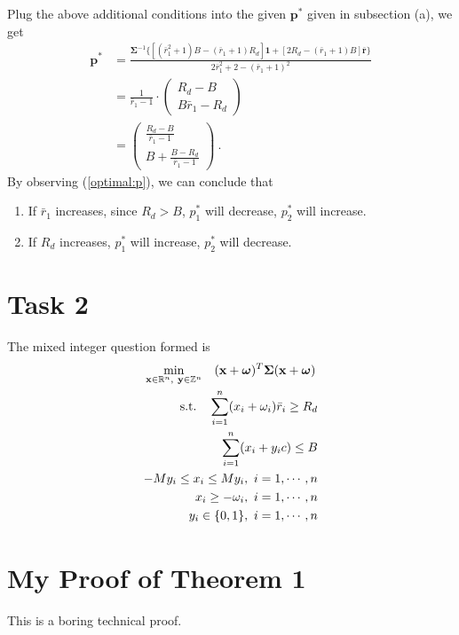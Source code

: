 \documentclass[12pt]{ftec2101}
\newcommand{\matr}[1]{\mathbf{#1}}
\newcommand{\vect}[1]{\mathbf{#1}}
\begin{document}
\noindent
Plug the above additional conditions into the given $\vect{p}^{*}$ given in subsection (a), we get
\begin{align}
    \vect{p}^{*} &= \frac{\matr{\Sigma}^{-1}\{[(\bar{r}_1^2+1)B-(\bar{r}_1+1)R_d]\vect{1}+[2R_d - (\bar{r}_1 + 1)B]\bar{\vect{r}}\}}{2\bar{r}_1^2 + 2 - (\bar{r}_1+1)^2} \\
    &= \frac{1}{\bar{r}_1 - 1} \cdot
    \begin{pmatrix}
        R_d - B \\
        B\bar{r}_1 - R_d
    \end{pmatrix}\\
    &=
    \begin{pmatrix}
        \frac{R_d-B}{\bar{r}_1 - 1} \\
        B+ \frac{B-R_d}{\bar{r}_1 - 1}
    \end{pmatrix}\ .
    \label{optimal:p}
\end{align}
By observing (\ref{optimal:p}), we can conclude that
\begin{enumerate}
    \item If $\bar{r}_1$ increases, since $R_d > B$, $p_1^{*}$ will decrease, $p_2^{*}$ will increase.
    \item If $R_d$ increases, $p_1^{*}$ will increase, $p_2^{*}$ will decrease.
\end{enumerate}

\section{Task 2}
The mixed integer question formed is
\begin{gather}
    \min_{\vect{x}\in\mathbb{R}^n ,\  \vect{y}\in \mathbb{Z}^n} \quad (\vect{x}+\boldsymbol{\omega})^T \matr{\Sigma} (\vect{x}+\boldsymbol{\omega}) \\
    \label{mix:integer}
    \begin{aligned}
    \textup{s.t.} \quad \sum_{i=1}^{n} (x_i+\omega_i)\bar{r}_i \geq R_d\\
                \sum_{i=1}^{n} (x_i+y_i c) \leq B\\
                -M y_i \leq x_i \leq M y_i,\ i=1,\cdots,n\\
                x_i \geq -\omega_i,\ i = 1,\cdots,n\\
                y_i \in \{0,1\},\ i = 1,\cdots,n
\end{aligned}
\end{gather}


\appendix

\section{My Proof of Theorem 1}

This is a boring technical proof.
 
\end{document}
